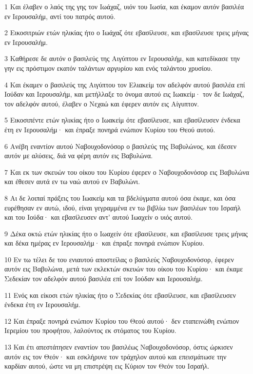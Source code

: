 \par 1 Και έλαβεν ο λαός της γης τον Ιωάχαζ, υιόν του Ιωσία, και έκαμον αυτόν βασιλέα εν Ιερουσαλήμ, αντί του πατρός αυτού.
\par 2 Εικοσιτριών ετών ηλικίας ήτο ο Ιωάχαζ ότε εβασίλευσε, και εβασίλευσε τρεις μήνας εν Ιερουσαλήμ.
\par 3 Καθήρεσε δε αυτόν ο βασιλεύς της Αιγύπτου εν Ιερουσαλήμ, και κατεδίκασε την γην εις πρόστιμον εκατόν ταλάντων αργυρίου και ενός ταλάντου χρυσίου.
\par 4 Και έκαμεν ο βασιλεύς της Αιγύπτου τον Ελιακείμ τον αδελφόν αυτού βασιλέα επί Ιούδαν και Ιερουσαλήμ, και μετήλλαξε το όνομα αυτού εις Ιωακείμ· τον δε Ιωάχαζ, τον αδελφόν αυτού, έλαβεν ο Νεχαώ και έφερεν αυτόν εις Αίγυπτον.
\par 5 Εικοσιπέντε ετών ηλικίας ήτο ο Ιωακείμ ότε εβασίλευσε, και εβασίλευσεν ένδεκα έτη εν Ιερουσαλήμ· και έπραξε πονηρά ενώπιον Κυρίου του Θεού αυτού.
\par 6 Ανέβη εναντίον αυτού Ναβουχοδονόσορ ο βασιλεύς της Βαβυλώνος, και έδεσεν αυτόν με αλύσεις, διά να φέρη αυτόν εις Βαβυλώνα.
\par 7 Και εκ των σκευών του οίκου του Κυρίου έφερεν ο Ναβουχοδονόσορ εις Βαβυλώνα και έθεσεν αυτά εν τω ναώ αυτού εν Βαβυλώνι.
\par 8 Αι δε λοιπαί πράξεις του Ιωακείμ και τα βδελύγματα αυτού όσα έκαμε, και όσα ευρέθησαν εν αυτώ, ιδού, είναι γεγραμμένα εν τω βιβλίω των βασιλέων του Ισραήλ και του Ιούδα· και εβασίλευσεν αντ' αυτού Ιωαχείν ο υιός αυτού.
\par 9 Δέκα οκτώ ετών ηλικίας ήτο ο Ιωαχείν ότε εβασίλευσε, και εβασίλευσε τρεις μήνας και δέκα ημέρας εν Ιερουσαλήμ· και έπραξε πονηρά ενώπιον Κυρίου.
\par 10 Εν τω τέλει δε του ενιαυτού αποστείλας ο βασιλεύς Ναβουχοδονόσορ, έφερεν αυτόν εις Βαβυλώνα, μετά των εκλεκτών σκευών του οίκου του Κυρίου· και έκαμε Σεδεκίαν τον αδελφόν αυτού βασιλέα επί τον Ιούδαν και Ιερουσαλήμ.
\par 11 Ενός και είκοσι ετών ηλικίας ήτο ο Σεδεκίας ότε εβασίλευσε, και εβασίλευσεν ένδεκα έτη εν Ιερουσαλήμ.
\par 12 Και έπραξε πονηρά ενώπιον Κυρίου του Θεού αυτού· δεν εταπεινώθη ενώπιον Ιερεμίου του προφήτου, λαλούντος εκ στόματος του Κυρίου.
\par 13 Και έτι απεστάτησεν εναντίον του βασιλέως Ναβουχοδονόσορ, όστις ώρκισεν αυτόν εις τον Θεόν· και εσκλήρυνε τον τράχηλον αυτού και επεισμάτωσε την καρδίαν αυτού, ώστε να μη επιστρέψη εις Κύριον τον Θεόν του Ισραήλ.
